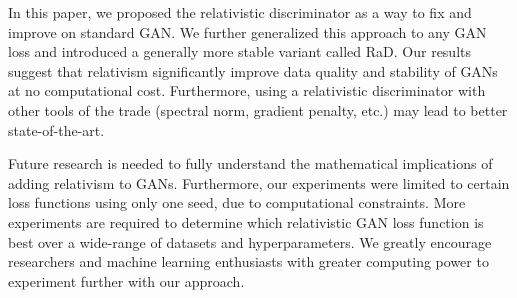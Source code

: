 \documentclass{article}
\begin{document}
In this paper, we proposed the relativistic discriminator as a way to fix and improve on standard GAN. We further generalized this approach to any GAN loss and introduced a generally more stable variant called RaD. Our results suggest that relativism significantly improve data quality and stability of GANs at no computational cost. Furthermore, using a relativistic discriminator with other tools of the trade (spectral norm, gradient penalty, etc.) may lead to better state-of-the-art. 

Future research is needed to fully understand the mathematical implications of adding relativism to GANs. Furthermore, our experiments were limited to certain loss functions using only one seed, due to computational constraints. More experiments are required to determine which relativistic GAN loss function is best over a wide-range of datasets and hyperparameters. We greatly encourage researchers and machine learning enthusiasts with greater computing power to experiment further with our approach.
\end{document}
